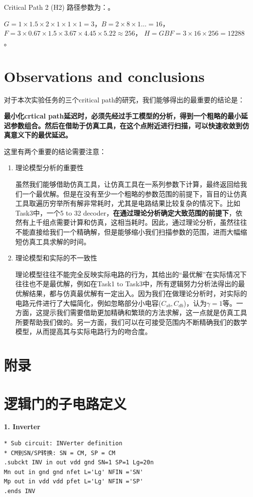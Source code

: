 \documentclass[UTF8,12pt,a4paper]{ctexart}
\begin{document}
Critical Path 2 (H2) 路径参数为：。

$G = 1 \times 1.5 \times 2 \times 1 \times 1 \times 1 = 3$，$B = 2 \times 8 \times 1 \dots = 16$，
$F = 3 \times 0.67 \times 1.5 \times 3.67 \times 4.45 \times 5.22 \approx 256$，
$H = GBF = 3 \times 16 \times 256 = 12288$。

\newpage
\section{Observations and conclusions}

对于本次实验任务的三个critical path的研究，我们能够得出的最重要的结论是：

\textbf{最小化crtical path延迟时，必须先经过手工模型的分析，得到一个粗略的最小延迟参数组合。然后在借助于仿真工具，在这个点附近进行扫描，可以快速收敛到仿真意义下的最优延迟。}

这里有两个重要的结论需要注意：
\begin{enumerate}
    \item 理论模型分析的重要性
    
    虽然我们能够借助仿真工具，让仿真工具在一系列参数下计算，最终返回给我们一个最优解。但是在没有至少一个粗略的参数范围的前提下，盲目的让仿真工具取遍历穷举所有解非常耗时，尤其是电路结果比较复杂的情况下。比如Task3中，一个5 to 32 decoder，\textbf{在通过理论分析确定大致范围的前提下}，依然有上千组点需要计算和仿真，这相当耗时。因此，通过理论分析，虽然往往不能直接给我们一个精确解，但是能够缩小我们扫描参数的范围，进而大幅缩短仿真工具求解的时间。

    \item 理论模型和实际的不一致性

    理论模型往往不能完全反映实际电路的行为，其给出的“最优解”在实际情况下往往也不是最优解，例如在Task1 to Task3中，所有逻辑努力分析法得出的最优解结果，都与仿真最优解有一定出入。因为我们在做理论分析时，对实际的电路元件进行了大幅简化，例如忽略部分小电容($C_{sb}, C_{db}$)，认为$\gamma = 1$等。一方面，这提示我们需要借助更加精确和繁琐的方法求解，这一点就是仿真工具所要帮助我们做的。另一方面，我们可以在可接受范围内不断精确我们的数学模型，从而提高其与实际电路行为的吻合度。
\end{enumerate}

\clearpage
\appendix
\section*{附录}

\section{逻辑门的子电路定义}
\textbf{1. Inverter}
\begin{lstlisting}
* Sub circuit: INVerter definition
* CM到SN/SP转换: SN = CM, SP = CM
.subckt INV in out vdd gnd SN=1 SP=1 Lg=20n
Mn out in gnd gnd nfet L='Lg' NFIN ='SN'
Mp out in vdd vdd pfet L='Lg' NFIN ='SP'
.ends INV
\end{lstlisting}
\end{document}
